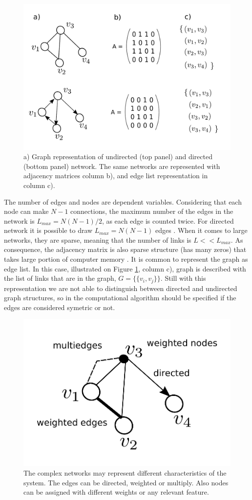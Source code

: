 \begin{figure}[!ht]
\centering
\includegraphics[width=0.7\linewidth]{figures/methodology/directed_graph.pdf} 
\caption{a) Graph representation of undirected (top panel) and directed (bottom panel) network. The same networks are represented with adjacency matrices column b), and edge list representation in column c).}
\label{fig:graph_dir}
\end{figure}

The number of edges and nodes are dependent variables. Considering that each node can make $N-1$ connections, the maximum number of the edges in the network is $L_{max}=N(N-1)/2$, as each edge is counted twice. For directed network it is possible to draw $L_{max}=N(N-1)$ edges \cite{caldarelli2007scalefree}. When it comes to large networks, they are sparse, meaning that the number of links is $L<<L_{max}$. As consequence, the adjacency matrix is also sparse structure (has many zeros) that takes large portion of computer memory \cite{barabasi2016network}. 
It is common to represent the graph as edge list. In this case, illustrated on Figure \ref{fig:graph_dir}, column c), graph is described with the list of links that are in the graph, $G = \{ \{v_i,v_j\}\}$. Still with this representation we are not able to distinguish between directed and undirected graph structures, so in the computational algorithm should be specified if the edges are considered symetric or not.  

\begin{figure}[!ht]
	\centering
	\includegraphics[width=0.4\linewidth]{figures/methodology/multi_graph.pdf} 
	\caption{The complex networks may represent different characteristics of the system. The edges can be directed, weighted or multiply. Also nodes can be assigned with different weights or any relevant feature.}
	\label{fig:multigraph}
\end{figure}

